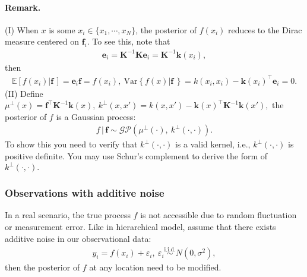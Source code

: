 \documentclass{article}
\begin{document}
\paragraph{Remark.}
(I) When $x$ is some $x_i\in\lbrace x_1,\cdots, x_N\rbrace$, the posterior of $f(x_i)$ reduces to the Dirac measure centered on $\mathbf{f}_i.$ To see this, note that
\begin{align*}
	\mathbf{e}_i = \mathbf{K}^{-1}\mathbf{Ke}_i = \mathbf{K}^{-1}\mathbf{k}(x_i),\tag{4.7}
\end{align*}
then
\begin{align*}
	\mathbb{E}\left[f(x_i)|\mathbf{f}\,\right] = \mathbf{e}_i\mathbf{f} = f(x_i),\ \mathrm{Var}\left\lbrace f(x)|\mathbf{f}\,\right\rbrace = k(x_i,x_i) - \mathbf{k}(x_i)^\top\mathbf{e}_i = 0.\tag{4.8}
\end{align*}
(II) Define $\mu^\perp(x) = \mathbf{f}^\top\mathbf{K}^{-1}\mathbf{k}(x),\ k^\perp(x,x') = k(x,x') - \mathbf{k}(x)^\top\mathbf{K}^{-1} \mathbf{k}(x'),$ the posterior of $f$ is a Gaussian process:
\begin{align*}
	f\,|\,\mathbf{f} \sim\mathcal{GP}\left(\mu^\perp(\cdot),\ k^\perp(\cdot,\cdot)\right).\tag{4.9}
\end{align*}
To show this you need to verify that $k^\perp(\cdot,\cdot)$ is a valid kernel, i.e., $k^\perp(\cdot,\cdot)$ is positive definite. You may use Schur's complement to derive the form of $k^\perp(\cdot,\cdot).$

\subsubsection{Observations with additive noise}
In a real scenario, the true process $f$ is not accessible due to random fluctuation or measurement error. Like in hierarchical model, assume that there exists additive noise in our observational data:
\begin{align*}
	y_i = f(x_i) + \varepsilon_i,\ \varepsilon_i\overset{\mathrm{i.i.d.}}{\sim} N(0,\sigma^2),\tag{4.10}
\end{align*}
then the posterior of $f$ at any location need to be modified.
\end{document}
